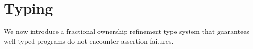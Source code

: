 \section{Typing}
\label{sec:typesystem}
We now introduce a
fractional ownership refinement type system that guarantees well-typed
programs do not encounter assertion failures.



